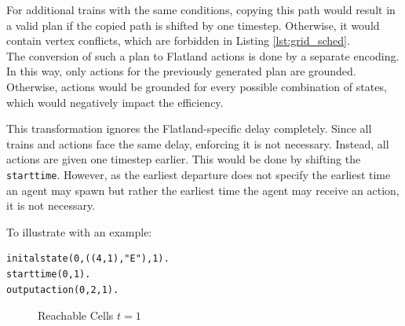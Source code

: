 \documentclass{llncs}
\begin{document}
\begin{multicols*}{2}
For additional trains with the same conditions, copying this path would result in a valid plan if the copied path is shifted by one timestep. Otherwise, it would contain vertex conflicts, which are forbidden in Listing \ref{lst:grid_sched}.\\

The conversion of such a plan to Flatland actions is done by a separate encoding. In this way, only actions for the previously generated plan are grounded. Otherwise, actions would be grounded for every possible combination of states, which would negatively impact the efficiency.

This transformation ignores the Flatland-specific delay completely. Since all trains and actions face the same delay, enforcing it is not necessary. Instead, all actions are given one timestep earlier. This would be done by shifting the \texttt{starttime}. However, as the earliest departure does not specify the earliest time an agent may spawn but rather the earliest time the agent may receive an action, it is not necessary.

To illustrate with an example:

\begin{verbatim}
initalstate(0,((4,1),"E"),1).
starttime(0,1).
outputaction(0,2,1).
\end{verbatim}

\begin{figure}[t]
    \begin{minipage}[b]{0.32\textwidth}
        \centering
        \caption{Reachable Cells $t=1$}
        \label{fig:ex1}
    \end{minipage}
    \begin{minipage}[b]{0.32\textwidth}
        \centering
\end{minipage}
\end{figure}
\end{multicols*}
\end{document}
